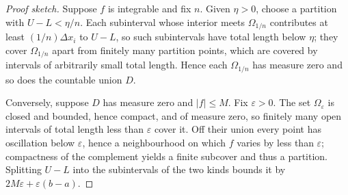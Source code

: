 \begin{proof}[Proof sketch]
Suppose $f$ is integrable and fix $n$. Given $\eta>0$, choose a partition
with $U-L<\eta/n$. Each subinterval whose interior meets $\Omega_{1/n}$
contributes at least $(1/n)\Delta x_i$ to $U-L$, so such subintervals have
total length below $\eta$; they cover $\Omega_{1/n}$ apart from finitely many
partition points, which are covered by intervals of arbitrarily small total
length. Hence each $\Omega_{1/n}$ has measure zero and so does the countable
union $D$.

Conversely, suppose $D$ has measure zero and $|f|\le M$. Fix $\varepsilon>0$.
The set $\Omega_\varepsilon$ is closed and bounded, hence compact, and of
measure zero, so finitely many open intervals of total length less than
$\varepsilon$ cover it. Off their union every point has oscillation below
$\varepsilon$, hence a neighbourhood on which $f$ varies by less than
$\varepsilon$; compactness of the complement yields a finite subcover and
thus a partition. Splitting $U-L$ into the subintervals of the two kinds
bounds it by $2M\varepsilon + \varepsilon(b-a)$.
\end{proof}

